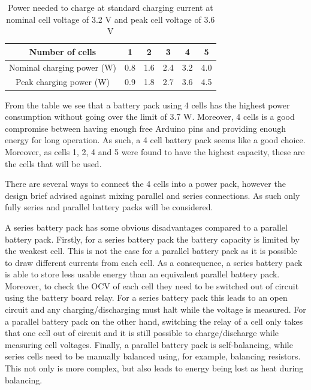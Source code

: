 \documentclass[a4paper]{article}
\begin{document}
\vspace{5pt}
\begin{table}[h!]
    \centering
    \begin{tabular}{||c| c c c c c||} 
        \hline
        Number of cells& 1 & 2 & 3 & 4 & 5 \\ [0.5ex] 
        \hline
        Nominal charging power (W) & 0.8 & 1.6 & 2.4 & 3.2 & 4.0\\ [1ex] 
        \hline
        Peak charging power (W) & 0.9 & 1.8 & 2.7 & 3.6 & 4.5 \\ [1ex] 
        \hline
    \end{tabular}
    \caption{Power needed to charge at standard charging current at nominal cell voltage of 3.2 V and peak cell voltage of 3.6 V}
    \label{table:2}
\end{table}
From the table we see that a battery pack using 4 cells has the highest 
power consumption without going over the limit of 3.7 W. Moreover, 
4 cells is a good compromise between having enough free Arduino 
pins and providing enough energy for long operation. As such,
a 4 cell battery pack seems like a good choice. Moreover, as cells 
1, 2, 4 and 5 were found to have the highest capacity, these 
are the cells that will be used. 

There are several ways to connect the 4 cells into a power pack, 
however the design brief advised against mixing parallel and series 
connections\cite{energyBrief}. As such only fully series and parallel 
battery packs will be considered. 

A series battery pack has some obvious disadvantages compared to 
a parallel battery pack. Firstly, for a series battery pack the 
battery capacity is limited by the weakest cell. This is not the 
case for a parallel battery pack as it is possible to draw different 
currents from each cell. As a consequence, a series battery pack
is able to store less usable energy than an equivalent parallel 
battery pack. Moreover, to check the OCV of each cell they need 
to be switched out of circuit using the battery board relay. 
For a series battery pack this leads to an open circuit and 
any charging/discharging must halt while the voltage is measured. 
For a parallel battery pack on the other hand, switching the 
relay of a cell only takes that one cell out of circuit and it 
is still possible to charge/discharge while measuring cell 
voltages. Finally, a parallel battery pack is 
self-balancing\cite{batteryBalancing}, while series cells 
need to be manually balanced using, for example, balancing 
resistors. This not only is more complex, but also leads to 
energy being lost as heat during balancing.
\end{document}
